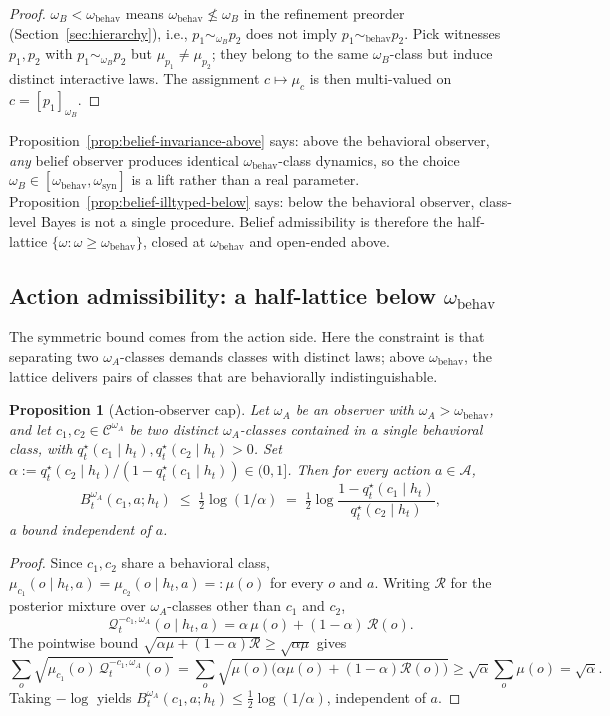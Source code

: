 \documentclass[11pt]{article}
\newtheorem{proposition}[theorem]{Proposition}
\theoremstyle{definition}
\theoremstyle{remark}
\newcommand{\Acal}{\mathcal{A}}
\newcommand{\Ccal}{\mathcal{C}}
\newcommand{\Qcal}{\mathcal{Q}}
\newcommand{\Rcal}{\mathcal{R}}
\begin{document}
\begin{proof}
$\omega_B<\omega_{\mathrm{behav}}$ means $\omega_{\mathrm{behav}}\not\le\omega_B$ in the refinement preorder (Section~\ref{sec:hierarchy}), i.e., $p_1\sim_{\omega_B}p_2$ does not imply $p_1\sim_{\mathrm{behav}}p_2$. Pick witnesses $p_1,p_2$ with $p_1\sim_{\omega_B}p_2$ but $\mu_{p_1}\neq\mu_{p_2}$; they belong to the same $\omega_B$-class but induce distinct interactive laws. The assignment $c\mapsto\mu_c$ is then multi-valued on $c=[p_1]_{\omega_B}$.
\end{proof}

Proposition~\ref{prop:belief-invariance-above} says: above the behavioral observer, \emph{any} belief observer produces identical $\omega_{\mathrm{behav}}$-class dynamics, so the choice $\omega_B\in[\omega_{\mathrm{behav}},\omega_{\mathrm{syn}}]$ is a lift rather than a real parameter. Proposition~\ref{prop:belief-illtyped-below} says: below the behavioral observer, class-level Bayes is not a single procedure. Belief admissibility is therefore the half-lattice $\{\omega:\omega\ge\omega_{\mathrm{behav}}\}$, closed at $\omega_{\mathrm{behav}}$ and open-ended above.

\subsection{Action admissibility: a half-lattice below $\omega_{\mathrm{behav}}$}
\label{sec:action-admissibility}

The symmetric bound comes from the action side. Here the constraint is that separating two $\omega_A$-classes demands classes with distinct laws; above $\omega_{\mathrm{behav}}$, the lattice delivers pairs of classes that are behaviorally indistinguishable.

\begin{proposition}[Action-observer cap]
\label{prop:action-cap}
Let $\omega_A$ be an observer with $\omega_A>\omega_{\mathrm{behav}}$, and let $c_1,c_2\in\Ccal^{\omega_A}$ be two distinct $\omega_A$-classes contained in a single behavioral class, with $q_t^\star(c_1\mid h_t),q_t^\star(c_2\mid h_t)>0$. Set $\alpha:=q_t^\star(c_2\mid h_t)/(1-q_t^\star(c_1\mid h_t))\in(0,1]$. Then for every action $a\in\Acal$,
\[
B_t^{\omega_A}(c_1,a;h_t)\;\le\;\tfrac{1}{2}\log(1/\alpha)
\;=\;\tfrac{1}{2}\log\!\frac{1-q_t^\star(c_1\mid h_t)}{q_t^\star(c_2\mid h_t)},
\]
a bound independent of $a$.
\end{proposition}

\begin{proof}
Since $c_1,c_2$ share a behavioral class, $\mu_{c_1}(o\mid h_t,a)=\mu_{c_2}(o\mid h_t,a)=:\mu(o)$ for every $o$ and $a$. Writing $\Rcal$ for the posterior mixture over $\omega_A$-classes other than $c_1$ and $c_2$,
\[
\Qcal_t^{-c_1,\omega_A}(o\mid h_t,a)=\alpha\,\mu(o)+(1-\alpha)\,\Rcal(o).
\]
The pointwise bound $\sqrt{\alpha\mu+(1-\alpha)\Rcal}\ge\sqrt{\alpha\mu}$ gives
\[
\sum_o\sqrt{\mu_{c_1}(o)\,\Qcal_t^{-c_1,\omega_A}(o)}=\sum_o\sqrt{\mu(o)\bigl(\alpha\mu(o)+(1-\alpha)\Rcal(o)\bigr)}\ge\sqrt{\alpha}\sum_o\mu(o)=\sqrt{\alpha}.
\]
Taking $-\log$ yields $B_t^{\omega_A}(c_1,a;h_t)\le\tfrac{1}{2}\log(1/\alpha)$, independent of $a$.
\end{proof}
\end{document}
